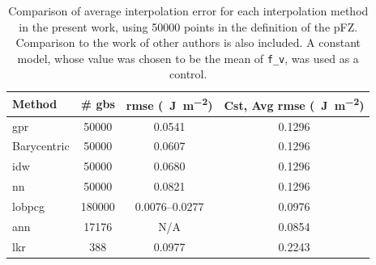 \documentclass[preprint,12pt]{elsarticle}
\begin{document}
\begin{table}
\caption{Comparison of average interpolation error for each interpolation method in the present work, using \num{50000} points in the definition of the pFZ. Comparison to the work of other authors is also included. A constant model, whose value was chosen to be the mean of \texttt{f\_v}, was used as a control.}
\centering
\begin{tabular}{lccc}
\toprule
Method                                                      & \multicolumn{1}{l}{\# \glspl{gb}} & \multicolumn{1}{l}{\gls{rmse} (\SI{}{\J\per\square\meter})} & \multicolumn{1}{l}{Cst, Avg \gls{rmse} (\SI{}{\J\per\square\meter})} \\ \midrule
\Gls{gpr}                                                   & \num{50000}                       & \num{0.0541}                                                & \num{0.1296}                                                         \\
Barycentric                                                 & \num{50000}                       & \num{0.0607}                                                & \num{0.1296}                                                         \\
\gls{idw}                                                   & \num{50000}                       & \num{0.0680}                                                & \num{0.1296}                                                         \\
\gls{nn}                                                    & \num{50000}                       & \num{0.0821}                                                & \num{0.1296}                                                         \\
\gls{lobpcg} \cite{shenDeterminingGrainBoundary2019}        & \num{180000}                      & \num{0.0076}--\num{0.0277}                                  & \num{0.0976}                                                         \\
\gls{ann} \cite{echeverrirestrepoUsingArtificialNeural2014} & \num{17176}                       & N/A                                                         & \num{0.0854}                                                         \\
\gls{lkr} \cite{chesserLearningGrainBoundary2020}           & \num{388}                         & \num{0.0977}                                                & \num{0.2243}                                                         \\ \bottomrule
\end{tabular}
\label{tab:rmse-error-comparison}
\end{table}
\end{document}
